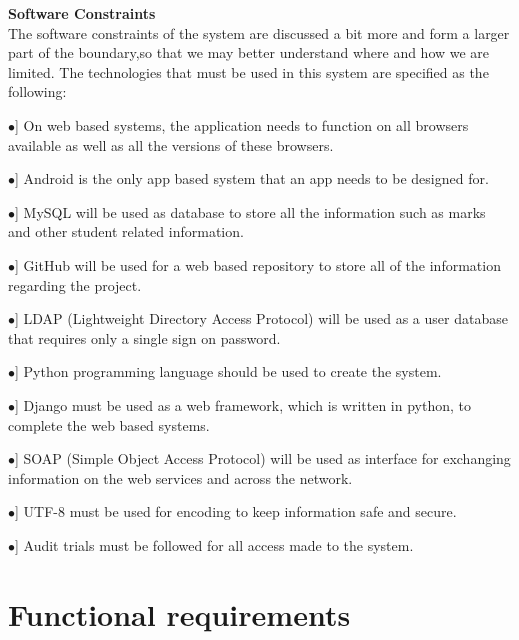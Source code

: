 \documentclass[12pt, a4paper]{scrartcl}
\newcommand{\tab}[1]{\hspace{.05\textwidth}\rlap{#1}}
\begin{document}
				\textbf{Software Constraints}\\
				The software constraints of the system are discussed a bit more and form a larger part of the boundary,so that we may better understand where and how we are limited. The technologies that must be used in this system are specified as the following:
				\begin{description}
					\item \tab [$\bullet$] On web based systems, the application needs to function on all browsers available as well as all the versions of these browsers.
					\item \tab [$\bullet$] Android is the only app based system that an app needs to be designed for.
					\item \tab [$\bullet$] MySQL will be used as database to store all the information such as marks and other student related information.
					\item \tab [$\bullet$] GitHub will be used for a web based repository to store all of the information regarding the project.
					\item \tab [$\bullet$] LDAP (Lightweight Directory Access Protocol) will be used as a user database that requires only a single sign on password.
					\item \tab [$\bullet$] Python programming language should be used to create the system.
					\item \tab [$\bullet$] Django must be used as a web framework, which is written in python, to complete the web based systems.
					\item \tab [$\bullet$] SOAP (Simple Object Access Protocol) will be used as interface for exchanging information on the web services and across the network.
					\item \tab [$\bullet$] UTF-8 must be used for encoding to keep information safe and secure.
					\item \tab [$\bullet$] Audit trials must be followed for all access made to the system.	
				\end{description}
			\pagebreak
		\section{Functional requirements}
\end{document}
